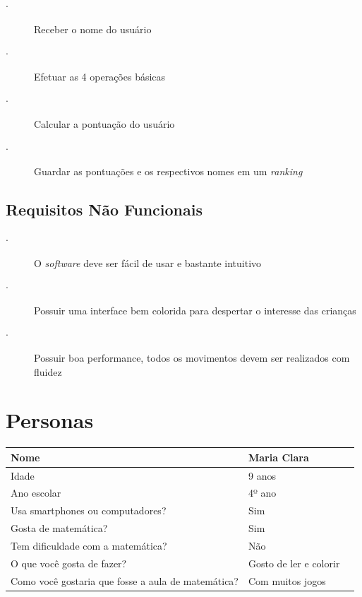 \documentclass[
    12pt,               %
    openany,          	%
    twoside,            %
    a4paper,            %
    brazil              %
    ]{abntex2}
\begin{document}
\begin{description}
\item[$\cdot$] Receber o nome do usuário
\item[$\cdot$] Efetuar as 4 operações básicas
\item[$\cdot$] Calcular a pontuação do usuário
\item[$\cdot$] Guardar as pontuações e os respectivos nomes em um \textit{ranking}
\end{description}

\section{Requisitos Não Funcionais}

\begin{description}
\item[$\cdot$] O \textit{software} deve ser fácil de usar e bastante intuitivo
\item[$\cdot$] Possuir uma interface bem colorida para despertar o interesse das crianças
\item[$\cdot$] Possuir boa performance, todos os movimentos devem ser realizados com fluidez
\end{description}


\chapter{Personas}

\begin{center} \begin{tabular}{ | l | p{5cm} | p{6cm} }
\hline Nome & Maria Clara\\\hline
Idade & 9 anos\\ \hline
Ano escolar & 4º ano\\ \hline Usa
smartphones ou computadores? & Sim \\ \hline
Gosta de matemática? & Sim \\ \hline
Tem dificuldade com a matemática? & Não \\ \hline
O que você gosta de fazer? & Gosto de ler e colorir \\ \hline
Como você gostaria que fosse a aula de matemática? & Com muitos jogos \\ \hline
\end{tabular} \end{center}
\end{document}
